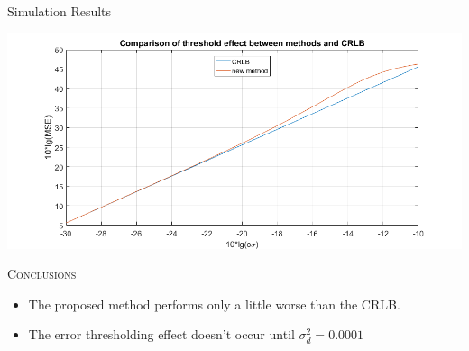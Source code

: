 \documentclass[10pt]{beamer}
\begin{document}
\begin{frame}{Simulation Results}
  \begin{center}
  \includegraphics[scale=0.35]{fig4.JPG}
  \end{center}
  \begin{center} \textsc{Conclusions} \end{center}
  \begin{itemize}
    \item \small The proposed method performs only a little worse than the CRLB.
    \item \small The error thresholding effect doesn't occur until $ \sigma_d^2 = 0.0001 $
  \end{itemize}
\end{frame}
\end{document}

